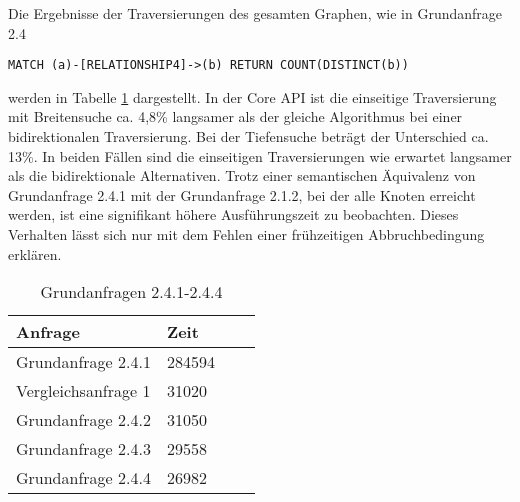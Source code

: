 \FloatBarrier
\noindent Die Ergebnisse der Traversierungen des gesamten Graphen, wie in Grundanfrage 2.4
 \begin{Verbatim}[frame=single]
MATCH (a)-[RELATIONSHIP4]->(b) RETURN COUNT(DISTINCT(b))
\end{Verbatim}
 werden in Tabelle \ref{tab:Query2_4} dargestellt.
 In der Core API ist die einseitige Traversierung mit Breitensuche ca. 4,8\% langsamer als der gleiche Algorithmus bei einer bidirektionalen Traversierung. Bei der Tiefensuche beträgt der Unterschied ca. 13\%. In beiden Fällen sind die einseitigen Traversierungen wie erwartet langsamer als die bidirektionale Alternativen. \newline
Trotz einer semantischen Äquivalenz von Grundanfrage 2.4.1 mit der Grundanfrage 2.1.2, bei der alle Knoten erreicht werden, ist eine signifikant höhere Ausführungszeit zu beobachten. Dieses Verhalten lässt sich nur mit dem Fehlen einer frühzeitigen Abbruchbedingung erklären.    
\FloatBarrier
\begin{table}[!htb]
	\centering
	\begin{tabular}{ |p{5cm}||p{3cm}|p{3cm}|p{3cm}|  }
		\hline
		Anfrage & Zeit\\
		\hline
		Grundanfrage 2.4.1 & 284594\\
		\hline
		Vergleichsanfrage 1 & 31020  \\
		\hline
		Grundanfrage 2.4.2 & 31050\\
		\hline
		Grundanfrage 2.4.3 &  29558  \\
		\hline
		Grundanfrage 2.4.4 &  26982\\
		\hline
	\end{tabular}
	\caption{Grundanfragen 2.4.1-2.4.4}
	\label{tab:Query2_4}
\end{table}
\FloatBarrier

